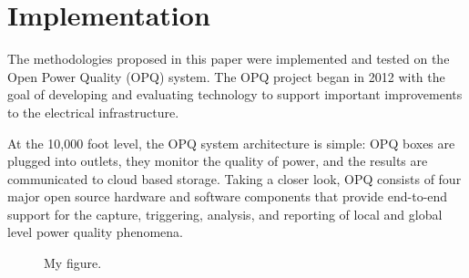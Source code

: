 \documentclass[10pt,conference,compsocconf]{IEEEtran}
\begin{document}
%




\section{Implementation}
The methodologies proposed in this paper were implemented and tested on the Open Power Quality (OPQ) system. The OPQ project began in 2012 with the goal of developing and evaluating technology to support important improvements to the electrical infrastructure. 

At the 10,000 foot level, the OPQ system architecture is simple: OPQ boxes are plugged into outlets, they monitor the quality of power, and the results are communicated to cloud based storage. Taking a closer look, OPQ consists of four major open source hardware and software components that provide end-to-end support for the capture, triggering, analysis, and reporting of local and global level power quality phenomena. 



\begin{figure}[htbp]
\centering%
\caption{My figure.}\label{myfigone}
\end{figure}
\end{document}
